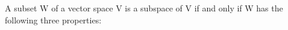 \documentclass[preview]{standalone}
\begin{document}
\begin{center}
A subset W of a vector space V is a subspace of V  if and only if W  has the following three properties:
\end{center}
\end{document}
